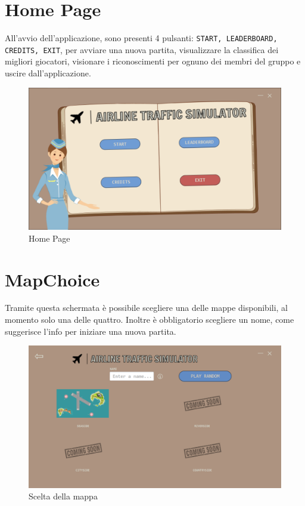 \documentclass[a4paper,12pt]{report}
\begin{document}
\section*{Home Page}
All'avvio dell'applicazione, sono presenti 4 pulsanti: \texttt{START, LEADERBOARD, CREDITS, EXIT}, per avviare una nuova partita, visualizzare la classifica dei migliori giocatori, visionare i riconoscimenti per ognuno dei membri del gruppo e uscire dall'applicazione.
\begin{figure}[H]
    \begin{center}
        \centering
        \includegraphics[width=\textwidth]{img/GuidaUtente/Home.png}
    \end{center}
    \caption{Home Page}
    \label{img:homepage}
\end{figure}

\section*{MapChoice}
Tramite questa schermata è possibile scegliere una delle mappe disponibili, al momento solo una delle quattro. Inoltre è obbligatorio scegliere un nome, come suggerisce l'info per iniziare una nuova partita.
\begin{figure}[H]
    \begin{center}
        \centering
        \includegraphics[width=\textwidth]{img/GuidaUtente/MapChoice.png}
    \end{center}
    \caption{Scelta della mappa}
    \label{img:mapchoice}
\end{figure}
\end{document}
